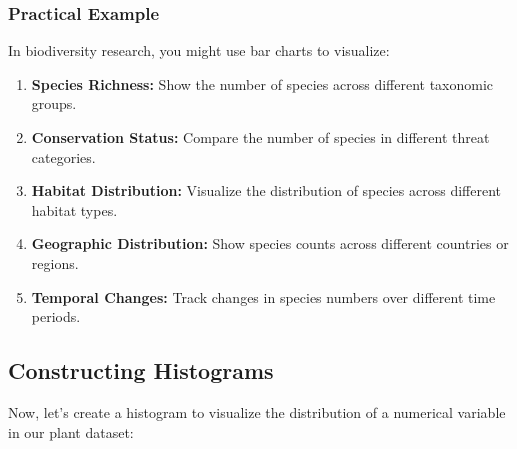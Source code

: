 \documentclass[
  letterpaper,
]{book}
\providecommand{\tightlist}{%
  \setlength{\itemsep}{0pt}\setlength{\parskip}{0pt}}
\begin{document}
\subsubsection{Practical Example}\label{practical-example}

In biodiversity research, you might use bar charts to visualize:

\begin{enumerate}
\def\labelenumi{\arabic{enumi}.}
\tightlist
\item
  \textbf{Species Richness:} Show the number of species across different
  taxonomic groups.
\item
  \textbf{Conservation Status:} Compare the number of species in
  different threat categories.
\item
  \textbf{Habitat Distribution:} Visualize the distribution of species
  across different habitat types.
\item
  \textbf{Geographic Distribution:} Show species counts across different
  countries or regions.
\item
  \textbf{Temporal Changes:} Track changes in species numbers over
  different time periods.
\end{enumerate}

\subsection{Constructing Histograms}\label{constructing-histograms}

Now, let's create a histogram to visualize the distribution of a
numerical variable in our plant dataset:
\end{document}
